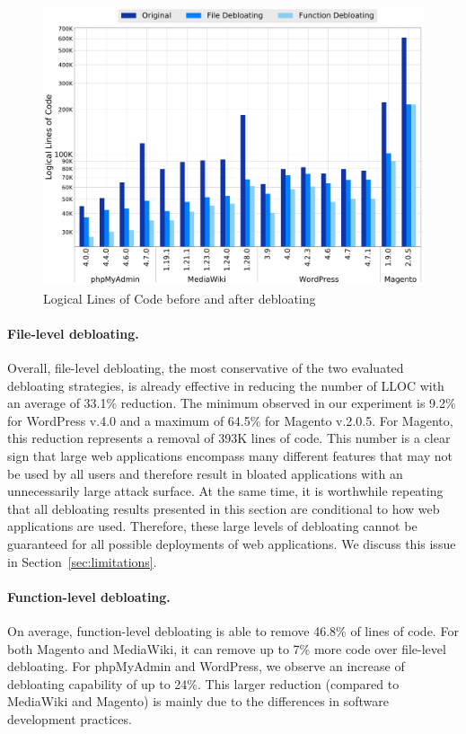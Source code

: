 \begin{figure}[t]
  \includegraphics[width=\linewidth]{figures/lloc.pdf}
  \caption{Logical Lines of Code before and after debloating}
  \label{fig:lloc}
\end{figure}


\paragraph{File-level debloating.}
Overall, file-level debloating, the most conservative of the two evaluated
debloating strategies, is already effective in reducing the number of LLOC with an average of 33.1\% reduction.
The minimum observed in our experiment is 9.2\% for WordPress
v.4.0 and a maximum of 64.5\% for Magento v.2.0.5. For Magento,
this reduction represents a removal of 393K lines of code.
This number is a clear sign that large web applications encompass many
different features that may not be used by all users and therefore result
in bloated applications with an unnecessarily large attack surface. At the same time, it is worthwhile repeating that all debloating results presented in this section are conditional to how web applications are used. Therefore, these large levels of debloating cannot be guaranteed for all possible deployments of web applications. We discuss this issue in Section~\ref{sec:limitations}.

\paragraph{Function-level debloating.}
On average, function-level debloating is able to remove 46.8\% of lines of code.
For both Magento and MediaWiki, it can remove up to
7\% more code over file-level debloating. For phpMyAdmin and WordPress, we observe an
increase of debloating capability of up to 24\%. This
larger reduction (compared to MediaWiki and Magento) is mainly due to
the differences in software development practices.

